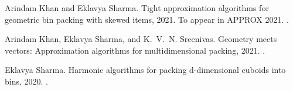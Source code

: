 

\frontmatter







\let\oldbibname\bibname
\renewcommand{\bibname}{Publications based on this Thesis}

\begin{thebibliography}{1}

Arindam Khan and Eklavya Sharma.
\newblock Tight approximation algorithms for geometric bin packing with skewed
  items, 2021.
\newblock To appear in APPROX 2021.
\newblock \href {http://arxiv.org/abs/2105.02827} {}.

Arindam Khan, Eklavya Sharma, and K.~V.~N. Sreenivas.
\newblock Geometry meets vectors: Approximation algorithms for multidimensional
  packing, 2021.
\newblock \href {http://arxiv.org/abs/2106.13951} {}.

Eklavya Sharma.
\newblock Harmonic algorithms for packing d-dimensional cuboids into bins,
  2020.
\newblock \href {http://arxiv.org/abs/2011.10963} {}.

\end{thebibliography}

\renewcommand{\bibname}{\oldbibname}

